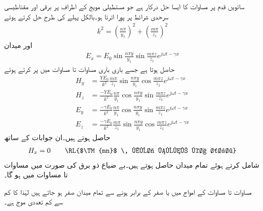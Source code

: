 ساتویں قدم پر مساوات  کا ایسا حل درکار ہے جو مستطیلی مویج کے اطراف پر برقی اور مقناطیسی سرحدی شرائط پر پورا اترتا ہو۔بالکل پہلے کی طرح حل کرتے ہوئے
\begin{align}\label{مساوات_مویج_عرضی_مقناطیسی_مستقل_قے_ب}
k^2=\left(\frac{n \pi}{y_1}\right)^2+\left(\frac{m \pi}{z_1}\right)^2
\end{align}
اور میدان
\begin{align}\label{مساوات_مویج_عرضی_مقناطیسی_حل_الف}
E_x=E_0 \sin \frac{n \pi y}{y_1} \sin \frac{m \pi z}{z_1} e^{j \omega t -\gamma x}
\end{align}
حاصل ہوتا ہے جسے باری باری مساوات  تا مساوات  میں پر کرتے ہوئے
\begin{align}
H_y&=\frac{Y E_0}{k^2} \frac{m \pi}{z_1}\sin \frac{n \pi y}{y_1} \cos \frac{m \pi z}{z_1} e^{j \omega t -\gamma x} \label{مساوات_مویج_عرضی_مقناطیسی_حل_ب}\\
H_z&=\frac{-Y E_0}{k^2} \frac{n\pi}{y_1}\cos \frac{n \pi y}{y_1} \sin \frac{m \pi z}{z_1} e^{j \omega t -\gamma x} \label{مساوات_مویج_عرضی_مقناطیسی_حل_پ}\\
E_y&=\frac{-\gamma E_0}{k^2}\frac{n\pi}{y_1}\cos \frac{n \pi y}{y_1} \sin \frac{m \pi z}{z_1} e^{j \omega t -\gamma x} \label{مساوات_مویج_عرضی_مقناطیسی_حل_ت}\\
E_z&=\frac{-\gamma E_0}{k^2} \frac{m \pi}{z_1}\sin \frac{n \pi y}{y_1} \cos \frac{m \pi z}{z_1} e^{j \omega t -\gamma x}\label{مساوات_مویج_عرضی_مقناطیسی_حل_ٹ}
\end{align}
حاصل ہوتے ہیں۔ان جوابات کے ساتھ
\begin{align}\label{مساوات_مویج_عرضی_مقناطیسی_حل_ث}
H_x=0  \quad \quad \text{\RL{$\TM{mn}$ \, موج ہونے کا شرط}} 
\end{align}
شامل کرتے ہوئے تمام میدان حاصل ہوتے ہیں۔بے ضیاع ذو برق  کی صورت میں مساوات  تا مساوات  میں  ہو  گا۔

مساوات  تا مساوات  کے  امواج  میں  یا  صفر کے برابر ہونے سے تمام میدان صفر ہو جاتے ہیں لہٰذا  کا کم سے کم تعددی موج  ہے۔

